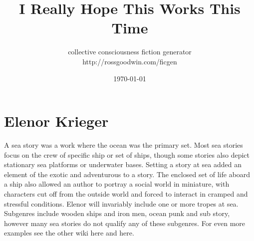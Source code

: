 \documentclass[12pt]{book}
\title{I Really Hope This Works This Time}
\author{collective consciousness fiction generator\\http://rossgoodwin.com/ficgen}
\date{\today}
\begin{document}
\maketitle



\chapter{Elenor Krieger}

A sea story was a work where the ocean was the primary set. Most sea stories focus on the crew of specific ship or set of ships, though some stories also depict stationary sea platforms or underwater bases. Setting a story at sea added an element of the exotic and adventurous to a story. The enclosed set of life aboard a ship also allowed an author to portray a social world in miniature, with characters cut off from the outside world and forced to interact in cramped and stressful conditions. Elenor will invariably include one or more tropes at sea. Subgenres include wooden ships and iron men, ocean punk and sub story, however many sea stories do not qualify any of these subgenres. For even more examples see the other wiki here and here.
\end{document}
